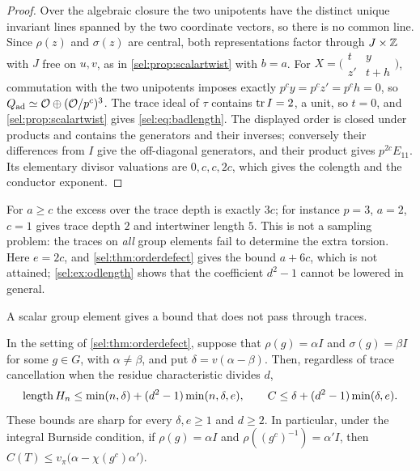 \begin{proof}
Over the algebraic closure the two unipotents have the distinct unique
invariant lines spanned by the two coordinate vectors, so there is no common
line. Since $\rho(z)$ and $\sigma(z)$ are central, both representations
factor through $J\times\mathbb{Z}$ with $J$ free on $u,v$, as in
\cref{sel:prop:scalartwist} with $b=a$. For
$X=\bigl(\begin{smallmatrix}t&y\\z'&t+h\end{smallmatrix}\bigr)$,
commutation with the two unipotents imposes exactly $p^cy=p^cz'=p^ch=0$, so
$Q_{\mathrm{ad}}\simeq\mathcal{O}\oplus(\mathcal{O}/p^c)^3$. The trace ideal of $\tau$
contains $\operatorname{tr} I=2$, a unit, so $t=0$, and \cref{sel:prop:scalartwist} gives
\eqref{sel:eq:badlength}. The displayed order is closed under products and
contains the generators and their inverses; conversely their differences
from $I$ give the off-diagonal generators, and their product gives
$p^{2c}E_{11}$. Its elementary divisor valuations are $0,c,c,2c$, which gives
the colength and the conductor exponent.
\end{proof}

For $a\ge c$ the excess over the trace depth is exactly $3c$; for instance
$p=3$, $a=2$, $c=1$ gives trace depth $2$ and intertwiner length $5$. This is
not a sampling problem: the traces on \emph{all} group elements fail to
determine the extra torsion. Here $e=2c$, and
\cref{sel:thm:orderdefect} gives the bound $a+6c$, which is not attained;
\cref{sel:ex:odlength} shows that the coefficient $d^2-1$ cannot be lowered
in general.

A scalar group element gives a bound that does not pass through traces.

\begin{corollary}\label{sel:cor:scalar}
In the setting of \cref{sel:thm:orderdefect}, suppose that $\rho(g)=\alpha I$
and $\sigma(g)=\beta I$ for some $g\in G$, with $\alpha\ne\beta$, and put
$\delta=v(\alpha-\beta)$. Then, regardless of trace cancellation when the
residue characteristic divides $d$,
\[
 \operatorname{length} H_n\le\min(n,\delta)+(d^2-1)\min(n,\delta,e),\qquad
 C\le\delta+(d^2-1)\min(\delta,e).
\]
These bounds are sharp for every $\delta,e\ge1$ and $d\ge2$. In particular,
under the integral Burnside condition, if $\rho(g)=\alpha I$ and
$\rho((g^c)^{-1})=\alpha'I$, then
$C(T)\le v_\pi\bigl(\alpha-\chi(g^c)\alpha'\bigr)$.
\end{corollary}

